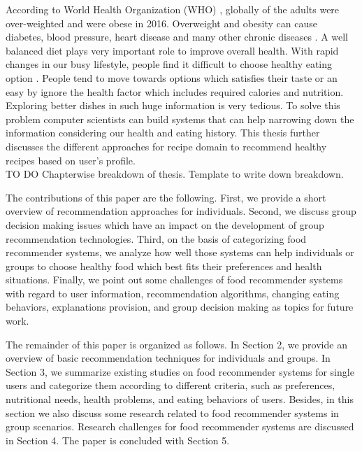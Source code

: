 According to World Health Organization (WHO) \cite{42}, globally  of the adults were over-weighted and  were obese in 2016. Overweight and obesity can cause diabetes, blood pressure, heart disease and many other chronic diseases \cite{43}. A well balanced diet plays very important role to improve overall health. With rapid changes in our busy lifestyle, people find it difficult to choose healthy eating option \cite{13}. People tend to move towards options which satisfies their taste or an easy by ignore the health factor which includes required calories and nutrition. Exploring better dishes in such huge information is very tedious. To solve this problem computer scientists can build systems that can help narrowing down the information considering our health and eating history. This thesis further discusses the different approaches for recipe domain to recommend healthy recipes based on user's profile.
\\

           TO DO        Chapterwise breakdown of thesis. Template to write down breakdown.

The contributions of this paper are the following. First, we provide a short overview of recommendation approaches for individuals. Second, we discuss group decision making issues which have an impact on the development of group recommendation technologies. Third, on the basis of categorizing food recommender systems, we analyze how well those systems can help individuals or groups to choose healthy food which best fits their preferences and health situations. Finally, we point out some challenges of food recommender systems with regard to user information, recommendation algorithms, changing eating behaviors, explanations provision, and group decision making as topics for future work.

The remainder of this paper is organized as follows. In Section 2, we provide an overview of basic recommendation techniques for individuals and groups. In Section 3, we summarize existing studies on food recommender systems for single users and categorize them according to different criteria, such as preferences, nutritional needs, health problems, and eating behaviors of users. Besides, in this section we also discuss some research related to food recommender systems in group scenarios. Research challenges for food recommender systems are discussed in Section 4. The paper is concluded with Section 5.


\pagebreak


